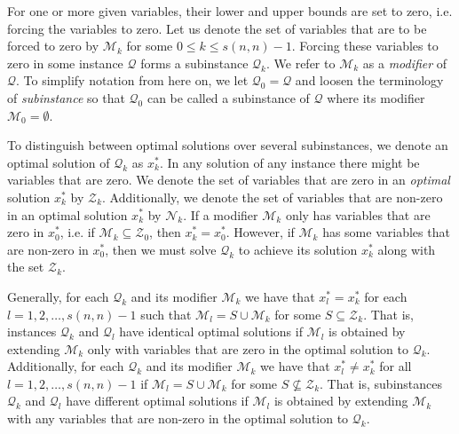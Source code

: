 For one or more given variables, their lower and upper bounds are set to zero,
i.e. forcing the variables to zero.
Let us denote the set of variables that are to be forced to zero by
$\mathcal{M}_k$ for some $0 \leq k \leq s(n, n) - 1$.
Forcing these variables to zero in some instance $\mathcal{Q}$ forms
a subinstance $\mathcal{Q}_k$. We refer to $\mathcal{M}_k$ as a
\emph{modifier} of $\mathcal{Q}$.
To simplify notation from here on, we let
$\mathcal{Q}_0 = \mathcal{Q}$ and loosen the terminology of
\emph{subinstance} so that $\mathcal{Q}_0$ can be called a subinstance of
$\mathcal{Q}$ where its modifier $\mathcal{M}_0 = \emptyset$.

To distinguish between optimal solutions over several subinstances, we denote
an optimal solution of $\mathcal{Q}_k$ as $x_k^*$.
In any solution of any instance there might be variables that are zero.
We denote the set of variables that are zero in an \emph{optimal} solution
$x_k^*$ by $\mathcal{Z}_k$.
Additionally, we denote the set of variables that are non-zero in an 
optimal solution $x_k^*$ by $\mathcal{N}_k$.
If a modifier $\mathcal{M}_k$ only has variables that are zero in $x_0^*$,
i.e. if $\mathcal{M}_k \subseteq \mathcal{Z}_0$, then $x_k^* = x_0^*$. However,
if $\mathcal{M}_k$ has some variables that are non-zero in $x_0^*$, then
we must solve $\mathcal{Q}_k$ to achieve its solution $x_k^*$ along with the
set $\mathcal{Z}_k$.

Generally, for each $\mathcal{Q}_k$ and its modifier $\mathcal{M}_k$ we
have that $x_l^* = x_k^*$ for each $l=1,2,\ldots,s(n, n)-1$ such that
$\mathcal{M}_l = S \cup \mathcal{M}_k$ for some $S \subseteq \mathcal{Z}_k$.
That is, instances $\mathcal{Q}_k$ and $\mathcal{Q}_l$ have identical optimal
solutions if $\mathcal{M}_l$ is obtained by extending $\mathcal{M}_k$ only with
variables that are zero in the optimal solution to $\mathcal{Q}_k$.
Additionally, for each $\mathcal{Q}_k$ and its modifier $\mathcal{M}_k$ we
have that $x_l^* \neq x_k^*$ for all $l=1,2,\ldots,s(n, n)-1$ if
$\mathcal{M}_l = S \cup \mathcal{M}_k$ for some $S\not\subseteq \mathcal{Z}_k$.
That is, subinstances $\mathcal{Q}_k$ and $\mathcal{Q}_l$ have different
optimal solutions if $\mathcal{M}_l$ is obtained by extending $\mathcal{M}_k$
with any variables that are non-zero in the optimal solution to
$\mathcal{Q}_k$.
